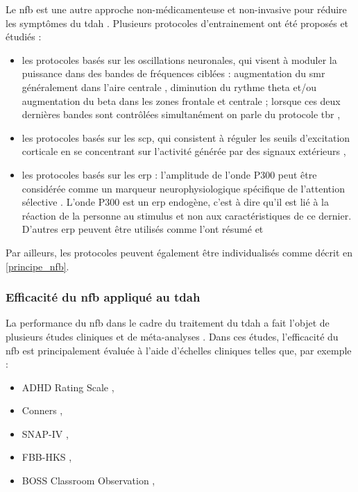 Le \gls{nfb} est une autre approche non-médicamenteuse et non-invasive pour réduire les symptômes du \gls{tdah} \citep{Arns2015, Marzbani2016}.  
Plusieurs protocoles d'entrainement ont été proposés et étudiés :
\begin{itemize}
\item les protocoles basés sur les oscillations neuronales, qui visent à moduler la puissance dans des bandes de fréquences ciblées : augmentation du 
\gls{smr} généralement dans l'aire centrale \citep{Beauregard2006}, diminution du rythme theta et/ou augmentation du beta dans les 
zones frontale et centrale \citep{Arns2015, Kropotov2005} ; lorsque ces deux dernières bandes sont contrôlées simultanément on parle du protocole 
\gls{tbr} \citep{Lubar1976, Arns2013}, 
\item les protocoles basés sur les \gls{scp}, qui consistent à réguler les seuils d'excitation corticale en se concentrant sur l'activité 
générée par des signaux extérieurs \citep{Heinrich2004, Banaschewski2007},
\item les protocoles basés sur les \gls{erp} : l'amplitude de l'onde P300 peut être considérée comme un marqueur neurophysiologique spécifique de l'attention 
sélective \citep{Desain2012, Fouillen2017}. L'onde P300 est un \gls{erp} endogène, c'est à dire qu'il est lié à la réaction de la personne au stimulus et non aux 
caractéristiques de ce dernier. D'autres \gls{erp} peuvent être utilisés comme l'ont résumé \citet{Johnstone2013} et \citet{Barry2003erp}
\end{itemize}

Par ailleurs, les protocoles peuvent également être individualisés comme décrit en \ref{principe_nfb}.

\subsubsection{Efficacité du \gls{nfb} appliqué au \gls{tdah}}

La performance du \gls{nfb} dans le cadre du traitement du \gls{tdah} a fait l'objet de plusieurs études cliniques \citep{Escolano2014, Maurizio2014, Strehl2017} 
et de méta-analyses \citep{Arns2009, Arns2013, Sonuga-Barke2013, Micoulaud2014, Cortese2016, Catala2017, Lambez2019}. Dans ces études, l'efficacité du \gls{nfb} est 
principalement évaluée à l'aide d'échelles cliniques telles que, par exemple :
\begin{itemize}
\item ADHD Rating Scale \citep{Pappas2006},
\item Conners \citep{Conners2008},
\item SNAP-IV \citep{Bussing2008},
\item FBB-HKS \citep{Breuer2009},
\item BOSS Classroom Observation \citep{Shapiro2010}, 
\end{itemize}

